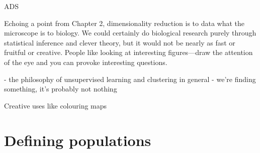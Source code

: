 ADS\citep{correard_allele_2022}


 Echoing a point from Chapter 2, dimensionality reduction is to data what the microscope is to biology. We could certainly do biological research purely through statistical inference and clever theory, but it would not be nearly as fast or fruitful or creative. People like looking at interesting figures---draw the attention of the eye and you can provoke interesting questions.

- the philosophy of unsupervised learning and clustering in general
- we're finding something, it's probably not nothing

Creative uses like colouring maps

\clearpage

\section{Defining populations}


